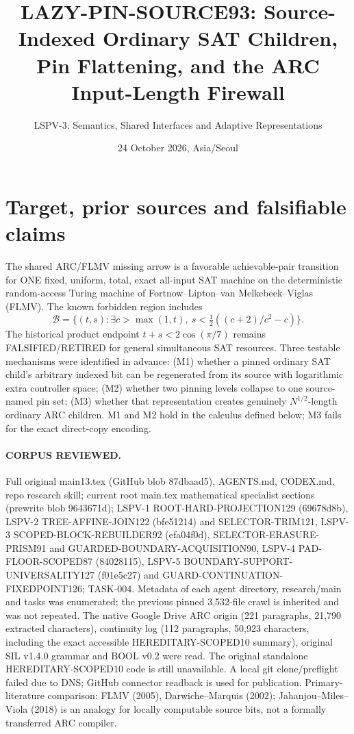 \documentclass[11pt]{article}
\title{LAZY-PIN-SOURCE93: Source-Indexed Ordinary SAT Children,\\Pin Flattening, and the ARC Input-Length Firewall}
\author{LSPV-3: Semantics, Shared Interfaces and Adaptive Representations}
\date{24 October 2026, Asia/Seoul}
\begin{document}
\maketitle
\begin{center}\end{center}
\section{Target, prior sources and falsifiable claims}
The shared ARC/FLMV missing arrow is a favorable achievable-pair transition for ONE fixed, uniform, total, exact all-input SAT machine on the deterministic random-access Turing machine of Fortnow--Lipton--van Melkebeek--Viglas (FLMV). The known forbidden region includes
\[
\mathcal B=\{(t,s):\exists c>\max(1,t),\
s<\tfrac12((c+2)/c^2-c)\}.
\]
The historical product endpoint $t+s<2\cos(\pi/7)$ remains FALSIFIED/RETIRED for general simultaneous SAT resources. Three testable mechanisms were identified in advance: (M1) whether a pinned ordinary SAT child's arbitrary indexed bit can be regenerated from its source with logarithmic extra controller space; (M2) whether two pinning levels collapse to one source-named pin set; (M3) whether that representation creates genuinely $N^{1/2}$-length ordinary ARC children. M1 and M2 hold in the calculus defined below; M3 fails for the exact direct-copy encoding.
\paragraph{CORPUS REVIEWED.}
Full original main13.tex (GitHub blob 87dbaad5), AGENTS.md, CODEX.md, repo research skill; current root main.tex mathematical specialist sections (prewrite blob 9643671d); LSPV-1 ROOT-HARD-PROJECTION129 (69678d8b), LSPV-2 TREE-AFFINE-JOIN122 (bfe51214) and SELECTOR-TRIM121, LSPV-3 SCOPED-BLOCK-REBUILDER92 (efa04f0d), SELECTOR-ERASURE-PRISM91 and GUARDED-BOUNDARY-ACQUISITION90, LSPV-4 PAD-FLOOR-SCOPED87 (84028115), LSPV-5 BOUNDARY-SUPPORT-UNIVERSALITY127 (f01e5c27) and GUARD-CONTINUATION-FIXEDPOINT126; TASK-004. Metadata of each agent directory, research/main and tasks was enumerated; the previous pinned 3,532-file crawl is inherited and was not repeated.
The native Google Drive ARC origin (221 paragraphs, 21,790 extracted characters), continuity log (112 paragraphs, 50,923 characters, including the exact accessible HEREDITARY-SCOPED10 summary), original SIL v1.4.0 grammar and BOOL v0.2 were read. The original standalone HEREDITARY-SCOPED10 code is still unavailable. A local git clone/preflight failed due to DNS; GitHub connector readback is used for publication. Primary-literature comparison: FLMV (2005), Darwiche--Marquis (2002); Jahanjou--Miles--Viola (2018) is an analogy for locally computable source bits, not a formally transferred ARC compiler.
\end{document}
